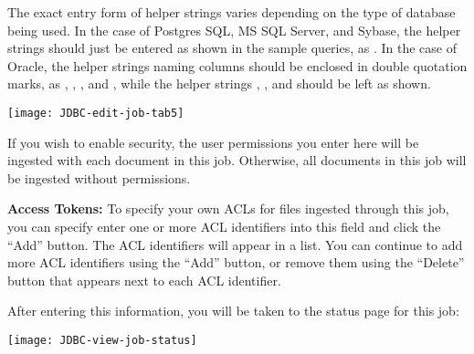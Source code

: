 The exact entry form of helper strings varies depending on the type of
database being used. In the case of Postgres SQL, MS SQL Server, and
Sybase, the helper strings should just be entered as shown in the
sample queries, as . In the case of Oracle, the
helper strings naming columns should be enclosed in double
quotation marks, as ,
,\linebreak
{}, and
, while the helper strings
, , and
 should be left as shown.

\texttt{[image: JDBC-edit-job-tab5]}

If you wish to enable security, the user permissions you enter here will
be ingested with each document in this job. Otherwise, all documents in
this job will be ingested without permissions.

\item \textbf{Access Tokens:} To specify your own ACLs for files ingested
through this job, you can specify enter one or more ACL identifiers into
this field and click the ``Add'' button. The ACL identifiers will appear
in a list. You can continue to add more ACL identifiers using the ``Add''
button, or remove them using the ``Delete'' button that appears next to
each ACL identifier.

After entering this information, you will be taken to the status page
for this job:

\texttt{[image: JDBC-view-job-status]}
